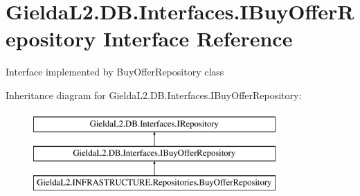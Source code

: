 \hypertarget{interface_gielda_l2_1_1_d_b_1_1_interfaces_1_1_i_buy_offer_repository}{}\section{Gielda\+L2.\+D\+B.\+Interfaces.\+I\+Buy\+Offer\+Repository Interface Reference}
\label{interface_gielda_l2_1_1_d_b_1_1_interfaces_1_1_i_buy_offer_repository}


Interface implemented by Buy\+Offer\+Repository class  


Inheritance diagram for Gielda\+L2.\+D\+B.\+Interfaces.\+I\+Buy\+Offer\+Repository\+:\begin{figure}[H]
\begin{center}
\leavevmode
\includegraphics[height=3.000000cm]{interface_gielda_l2_1_1_d_b_1_1_interfaces_1_1_i_buy_offer_repository}
\end{center}
\end{figure}
